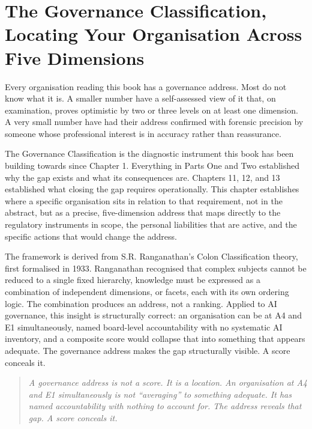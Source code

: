 
\chapter{The Governance Classification, Locating Your Organisation Across Five Dimensions}

Every organisation reading this book has a governance address. Most do not know what it is. A smaller number have a self-assessed view of it that, on examination, proves optimistic by two or three levels on at least one dimension. A very small number have had their address confirmed with forensic precision by someone whose professional interest is in accuracy rather than reassurance.

The Governance Classification is the diagnostic instrument this book has been building towards since Chapter 1. Everything in Parts One and Two established why the gap exists and what its consequences are. Chapters 11, 12, and 13 established what closing the gap requires operationally. This chapter establishes where a specific organisation sits in relation to that requirement, not in the abstract, but as a precise, five-dimension address that maps directly to the regulatory instruments in scope, the personal liabilities that are active, and the specific actions that would change the address.

The framework is derived from S.R. Ranganathan's Colon Classification theory, first formalised in 1933. Ranganathan recognised that complex subjects cannot be reduced to a single fixed hierarchy, knowledge must be expressed as a combination of independent dimensions, or facets, each with its own ordering logic. The combination produces an address, not a ranking. Applied to AI governance, this insight is structurally correct: an organisation can be at A4 and E1 simultaneously, named board-level accountability with no systematic AI inventory, and a composite score would collapse that into something that appears adequate. The governance address makes the gap structurally visible. A score conceals it.

\begin{quote}
\emph{A governance address is not a score. It is a location. An organisation at A4 and E1 simultaneously is not ``averaging'' to something adequate. It has named accountability with nothing to account for. The address reveals that gap. A score conceals it.}
\end{quote}

